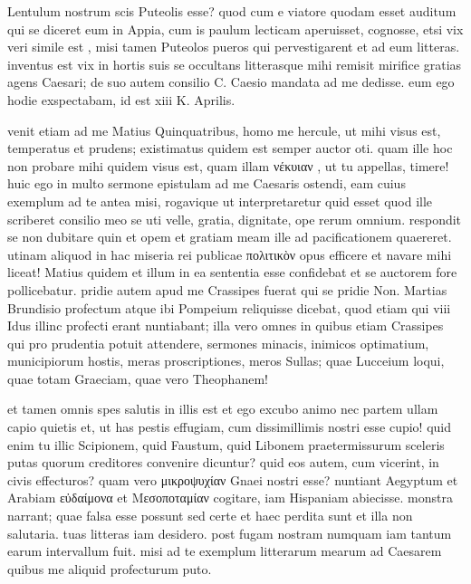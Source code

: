 


 Lentulum nostrum scis Puteolis esse? quod cum e viatore quodam esset auditum qui se diceret eum in Appia, cum is paulum lecticam aperuisset, cognosse, etsi vix veri simile est , misi tamen Puteolos pueros qui pervestigarent et ad eum litteras. inventus est vix in hortis suis se occultans litterasque mihi remisit mirifice gratias agens Caesari; de suo autem consilio C. Caesio mandata ad me dedisse. eum ego hodie exspectabam, id est xiii K. Aprilis.

 venit etiam ad me Matius Quinquatribus, homo me hercule, ut mihi visus est, temperatus et prudens; existimatus quidem est semper auctor oti. quam ille hoc non probare mihi quidem visus est, quam illam νέκυιαν , ut tu appellas, timere! huic ego in multo sermone epistulam ad me Caesaris ostendi, eam cuius exemplum ad te antea misi, rogavique ut interpretaretur quid esset quod ille scriberet consilio meo se uti velle, gratia, dignitate, ope rerum omnium. respondit se non dubitare quin et opem et gratiam meam ille ad pacificationem quaereret. utinam aliquod in hac miseria rei publicae πολιτικὸν opus efficere et navare mihi liceat! Matius quidem et illum in ea sententia esse confidebat et se auctorem fore pollicebatur. pridie autem apud me Crassipes fuerat qui se pridie Non. Martias Brundisio profectum atque ibi Pompeium reliquisse dicebat, quod etiam qui viii Idus illinc profecti erant nuntiabant; illa vero omnes in quibus etiam Crassipes qui pro prudentia potuit attendere, sermones minacis, inimicos optimatium, municipiorum hostis, meras proscriptiones, meros Sullas; quae Lucceium loqui, quae totam Graeciam, quae vero Theophanem!

 et tamen omnis spes salutis in illis est et ego excubo animo nec partem ullam capio quietis et, ut has pestis effugiam, cum dissimillimis nostri esse cupio! quid enim tu illic Scipionem, quid Faustum, quid Libonem praetermissurum sceleris putas quorum creditores convenire dicuntur? quid eos autem, cum vicerint, in civis effecturos? quam vero μικροψυχίαν Gnaei nostri esse? nuntiant Aegyptum et Arabiam εὐδαίμονα et Μεσοποταμίαν cogitare, iam Hispaniam abiecisse. monstra narrant; quae falsa esse possunt sed certe et haec perdita sunt et illa non salutaria. tuas litteras iam desidero. post fugam nostram numquam iam tantum earum intervallum fuit. misi ad te exemplum litterarum mearum ad Caesarem quibus me aliquid profecturum puto.
